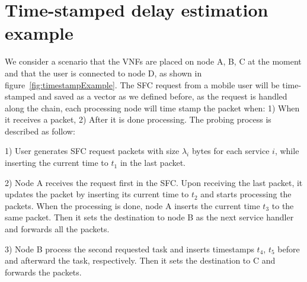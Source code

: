 \section{Time-stamped delay estimation example}
We consider a scenario that the VNFs are placed on node A, B, C at the moment and that the user is connected to node D, as shown in figure~\ref{fig:timestampExample}. The SFC request from a mobile user will be time-stamped and saved as a vector as we defined before, as the request is handled along the chain, each processing node will time stamp the packet when: 1) When it receives a packet, 2) After it is done processing. The probing process is described as follow:

1) User generates SFC request packets with size $\lambda_i$ bytes for each service $i$, while inserting the current time to $t_1$ in the last packet.

2) Node A receives the request first in the SFC. Upon receiving the last packet, it updates the packet by inserting its current time to $t_2$ and starts processing the packets. When the processing is done, node A inserts the current time $t_3$ to the same packet. Then it sets the destination to node B as the next service handler and forwards all the packets.

3) Node B process the second requested task and inserts timestamps $t_4$, $t_5$ before and afterward the task, respectively. Then it sets the destination to C and forwards the packets.

